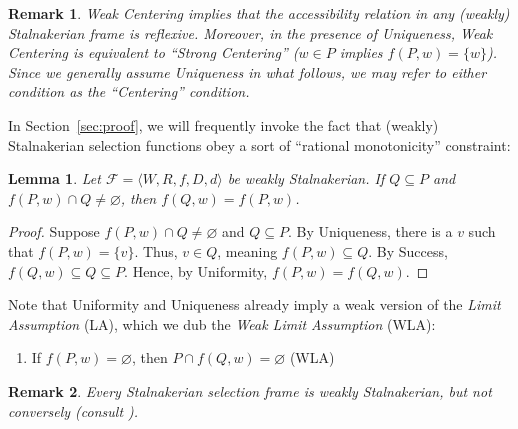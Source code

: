 \documentclass[12pt]{article}
\newtheorem{lemma}{Lemma}
\newtheorem{remark}{Remark}
\newcommand{\tup}[1]{\langle #1 \rangle}
\begin{document}

\begin{remark}
\label{Remark:Elementary Stalnakerian Properties}
    Weak Centering implies that the accessibility relation in any (weakly) Stalnakerian frame is reflexive. 
    Moreover, in the presence of Uniqueness, Weak Centering is equivalent to ``Strong Centering'' ($w \in P$ implies $f(P,w) = \{w\}$). 
    Since we generally assume Uniqueness in what follows, we may refer to either condition as the ``Centering'' condition. 
\end{remark}

In Section~\ref{sec:proof}, we will frequently invoke the fact that (weakly) Stalnakerian selection functions obey a sort of ``rational monotonicity'' constraint:

\begin{lemma}\label{lem:rat}
    Let $\mathcal{F} = \tup{W,R,f,D,d}$ be weakly Stalnakerian. 
    If $Q \subseteq P$ and $f(P,w) \cap Q \neq \varnothing$, then $f(Q,w) = f(P,w)$. 
\end{lemma}

\begin{proof}
    Suppose $f(P,w) \cap Q \neq \varnothing$ and $Q \subseteq P$. 
    By Uniqueness, there is a $v$ such that $f(P,w) = \{v\}$. 
    Thus, $v \in Q$, meaning $f(P,w) \subseteq Q$. 
    By Success, $f(Q,w) \subseteq Q \subseteq P$. 
    Hence, by Uniformity, $f(P,w) = f(Q,w)$. 
\end{proof}

Note that Uniformity and Uniqueness already imply a weak version of the \emph{Limit Assumption} (LA), which we dub the \emph{Weak Limit Assumption} (WLA):
    \begin{enumerate}
        \item[3$^-$.] If $f(P,w) = \varnothing$, then $P \cap f(Q,w) = \varnothing$ \hfill (WLA)
    \end{enumerate}

\begin{remark}
    \label{Remark:StalnakerianvsWeaklyStalnakerian}
    Every Stalnakerian selection frame is weakly Stalnakerian, but not conversely (consult \cite[Section~2]{KocurekWalshWeissA}).
\end{remark}

\end{document}
